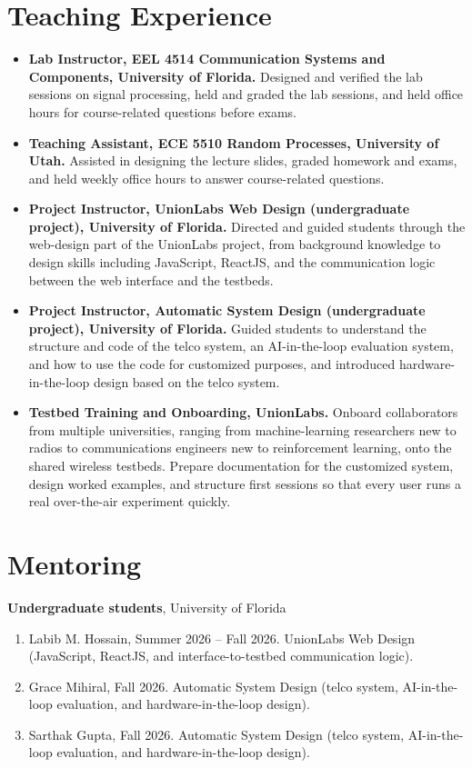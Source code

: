 \documentclass[10pt]{article}
\begin{document}
\section*{Teaching Experience}
\begin{itemize}
\item \textbf{Lab Instructor, EEL 4514 Communication Systems and Components, University of Florida.} Designed and verified the lab sessions on signal processing, held and graded the lab sessions, and held office hours for course-related questions before exams.
\item \textbf{Teaching Assistant, ECE 5510 Random Processes, University of Utah.} Assisted in designing the lecture slides, graded homework and exams, and held weekly office hours to answer course-related questions.
\item \textbf{Project Instructor, UnionLabs Web Design (undergraduate project), University of Florida.} Directed and guided students through the web-design part of the UnionLabs project, from background knowledge to design skills including JavaScript, ReactJS, and the communication logic between the web interface and the testbeds.
\item \textbf{Project Instructor, Automatic System Design (undergraduate project), University of Florida.} Guided students to understand the structure and code of the telco system, an AI-in-the-loop evaluation system, and how to use the code for customized purposes, and introduced hardware-in-the-loop design based on the telco system.
\item \textbf{Testbed Training and Onboarding, UnionLabs.} Onboard collaborators from multiple universities, ranging from machine-learning researchers new to radios to communications engineers new to reinforcement learning, onto the shared wireless testbeds. Prepare documentation for the customized system, design worked examples, and structure first sessions so that every user runs a real over-the-air experiment quickly.
\end{itemize}

\section*{Mentoring}
\textbf{Undergraduate students}, University of Florida
\begin{enumerate}[leftmargin=1.6em]
\item Labib M. Hossain, Summer 2026 -- Fall 2026. UnionLabs Web Design (JavaScript, ReactJS, and interface-to-testbed communication logic).
\item Grace Mihiral, Fall 2026. Automatic System Design (telco system, AI-in-the-loop evaluation, and hardware-in-the-loop design).
\item Sarthak Gupta, Fall 2026. Automatic System Design (telco system, AI-in-the-loop evaluation, and hardware-in-the-loop design).
\end{enumerate}
\end{document}
